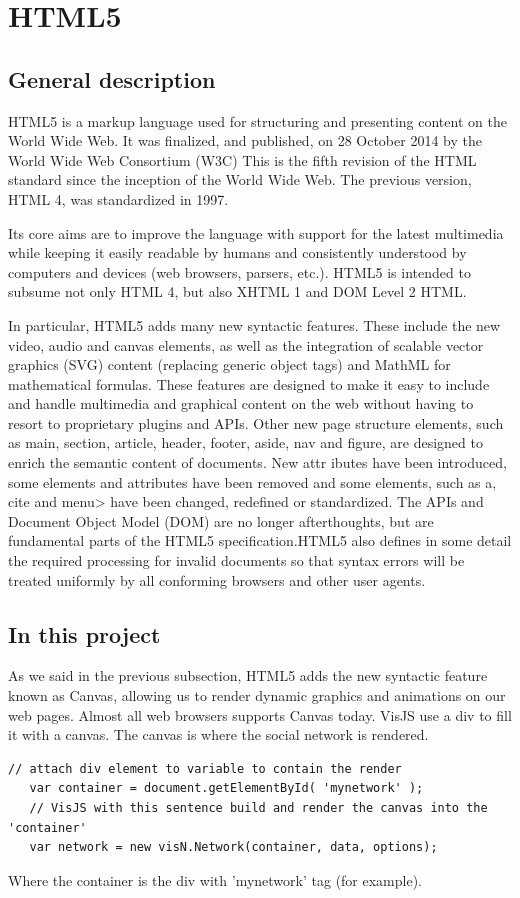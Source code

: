 \documentclass[a4paper, 12pt]{book}
\begin{document}
\section{HTML5}
\label{sec:html5}
\subsection{General description}
\label{sec:html5gd}
HTML5 is a markup language used for structuring and presenting content on the World Wide Web. It was finalized, and published, on 28 October 2014 by the World Wide Web Consortium (W3C) This is the fifth revision of the HTML standard since the inception of the World Wide Web. The previous version, HTML 4, was standardized in 1997.

Its core aims are to improve the language with support for the latest multimedia while keeping it easily readable by humans and consistently understood by computers and devices (web browsers, parsers, etc.). HTML5 is intended to subsume not only HTML 4, but also XHTML 1 and DOM Level 2 HTML.

In particular, HTML5 adds many new syntactic features. These include the new video, audio and canvas elements, as well as the integration of scalable vector graphics (SVG) content (replacing generic object tags) and MathML for mathematical formulas. These features are designed to make it easy to include and handle multimedia and graphical content on the web without having to resort to proprietary plugins and APIs. Other new page structure elements, such as main, section, article, header, footer, aside, nav and figure, are designed to enrich the semantic content of documents. New attr	ibutes have been introduced, some elements and attributes have been removed and some elements, such as a, cite and menu> have been changed, redefined or standardized. The APIs and Document Object Model (DOM) are no longer afterthoughts, but are fundamental parts of the HTML5 specification.HTML5 also defines in some detail the required processing for invalid documents so that syntax errors will be treated uniformly by all conforming browsers and other user agents.
\subsection{In this project}
\label{sec:html5itp}
As we said in the previous subsection, HTML5 adds the new syntactic feature known as Canvas, allowing us to render dynamic graphics and animations on our web pages. Almost all web browsers supports Canvas today.
VisJS use a div to fill it with a canvas. The canvas is where the social network is rendered.
\lstset{language=Java, breaklines=true, basicstyle=\footnotesize}
\begin{lstlisting}[frame=single]
   // attach div element to variable to contain the render
   var container = document.getElementById( 'mynetwork' );
   // VisJS with this sentence build and render the canvas into the 'container'
   var network = new visN.Network(container, data, options);
\end{lstlisting}
Where the container is the div with 'mynetwork' tag (for example).
\end{document}
